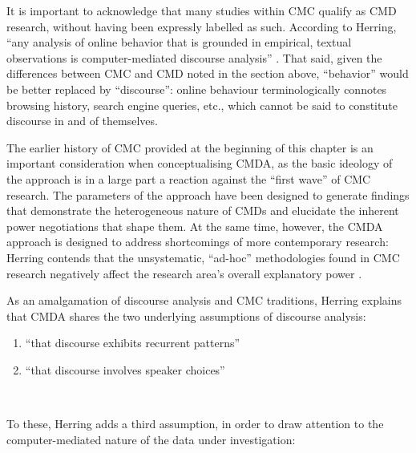 			It is important to acknowledge that many studies within CMC qualify as CMD research, without having been expressly labelled as such. According to Herring, ``any analysis of online behavior that is grounded in empirical, textual observations is computer-mediated discourse analysis'' \textcite[p.~2]{herring_computer-mediated_2004}. That said, given the differences between CMC and CMD noted in the section above, ``behavior'' would be better replaced by ``discourse'': online behaviour terminologically connotes browsing history, search engine queries, etc., which cannot be said to constitute discourse in and of themselves.

			The earlier history of CMC provided at the beginning of this chapter is an important consideration when conceptualising CMDA, as the basic ideology of the approach is in a large part a reaction against the ``first wave'' of CMC research. The parameters of the approach have been designed to generate findings that demonstrate the heterogeneous nature of CMDs and elucidate the inherent power negotiations that shape them. At the same time, however, the CMDA approach is designed to address shortcomings of more contemporary research: Herring contends that the unsystematic, ``ad-hoc'' methodologies found in CMC research negatively affect the research area's overall explanatory power \citeyear{herring_computer-mediated_2004}.

			As an amalgamation of discourse analysis and CMC traditions, Herring explains that CMDA shares the two underlying assumptions of discourse analysis:

			\begin{enumerate}
			\item ``that discourse exhibits recurrent patterns''
			\item ``that discourse involves speaker choices''
			\end{enumerate}

			~\\


			To these, Herring adds a third assumption, in order to draw attention to the computer-mediated nature of the data under investigation:

